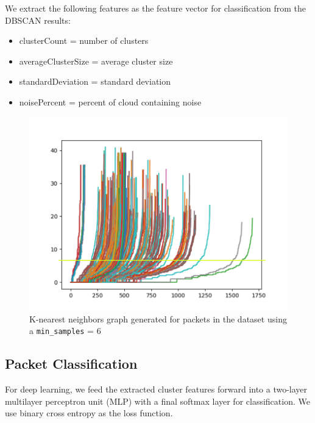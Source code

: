 We extract the following features as the feature vector for classification from the DBSCAN results:
\begin{itemize}
    \item clusterCount = number of clusters
    \item averageClusterSize = average cluster size
    \item standardDeviation = standard deviation
    \item noisePercent = percent of cloud containing noise
\end{itemize}

\begin{figure} [ht!]
\includegraphics[width=\linewidth]{chapters/6/img/kmembersgraph.png}
\caption{K-nearest neighbors graph generated for packets in the dataset using a \texttt{min\_samples} = 6}
\label{fig:kneighborsgraph}
\end{figure}

\subsection{Packet Classification}
For deep learning, we feed the extracted cluster features forward into a two-layer multilayer perceptron unit (MLP) with a final softmax layer for classification. We use binary cross entropy as the loss function.
